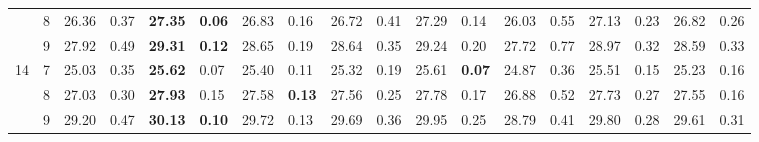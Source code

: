 \documentclass[conference]{IEEEtran}
\begin{document}
\begin{table}[t]
\begin{tabular}{|cc|ll|ll|ll|ll|ll|ll|ll|ll|}
		\multicolumn{1}{|c|}{}                    & 8          & \multicolumn{1}{l|}{26.36}         & 0.37                              & \multicolumn{1}{l|}{\textbf{27.35}} & \textbf{0.06}                     & \multicolumn{1}{l|}{26.83}         & 0.16                              & \multicolumn{1}{l|}{26.72}         & 0.41                              & \multicolumn{1}{l|}{27.29}                & 0.14          & \multicolumn{1}{l|}{26.03} & 0.55 & \multicolumn{1}{l|}{27.13}          & 0.23          & \multicolumn{1}{l|}{26.82} & 0.26 \\ \cline{2-18} 
		\multicolumn{1}{|c|}{}                    & 9          & \multicolumn{1}{l|}{27.92}         & 0.49                              & \multicolumn{1}{l|}{\textbf{29.31}} & \textbf{0.12}                     & \multicolumn{1}{l|}{28.65}         & 0.19                              & \multicolumn{1}{l|}{28.64}         & 0.35                              & \multicolumn{1}{l|}{29.24}                & 0.20          & \multicolumn{1}{l|}{27.72} & 0.77 & \multicolumn{1}{l|}{28.97}          & 0.32          & \multicolumn{1}{l|}{28.59} & 0.33 \\ \hline
		\multicolumn{1}{|c|}{\multirow{3}{*}{14}} & 7          & \multicolumn{1}{l|}{25.03}         & 0.35                              & \multicolumn{1}{l|}{\textbf{25.62}} & 0.07                              & \multicolumn{1}{l|}{25.40}         & 0.11                              & \multicolumn{1}{l|}{25.32}         & 0.19                              & \multicolumn{1}{l|}{25.61}                & \textbf{0.07} & \multicolumn{1}{l|}{24.87} & 0.36 & \multicolumn{1}{l|}{25.51}          & 0.15          & \multicolumn{1}{l|}{25.23} & 0.16 \\ \cline{2-18} 
		\multicolumn{1}{|c|}{}                    & 8          & \multicolumn{1}{l|}{27.03}         & 0.30                              & \multicolumn{1}{l|}{\textbf{27.93}} & 0.15                              & \multicolumn{1}{l|}{27.58}         & \textbf{0.13}                     & \multicolumn{1}{l|}{27.56}         & 0.25                              & \multicolumn{1}{l|}{27.78}                & 0.17          & \multicolumn{1}{l|}{26.88} & 0.52 & \multicolumn{1}{l|}{27.73}          & 0.27          & \multicolumn{1}{l|}{27.55} & 0.16 \\ \cline{2-18} 
		\multicolumn{1}{|c|}{}                    & 9          & \multicolumn{1}{l|}{29.20}         & 0.47                              & \multicolumn{1}{l|}{\textbf{30.13}} & \textbf{0.10}                     & \multicolumn{1}{l|}{29.72}         & 0.13                              & \multicolumn{1}{l|}{29.69}         & 0.36                              & \multicolumn{1}{l|}{29.95}                & 0.25          & \multicolumn{1}{l|}{28.79} & 0.41 & \multicolumn{1}{l|}{29.80}          & 0.28          & \multicolumn{1}{l|}{29.61} & 0.31 \\ \hline

\end{tabular}
\end{table}
\end{document}

